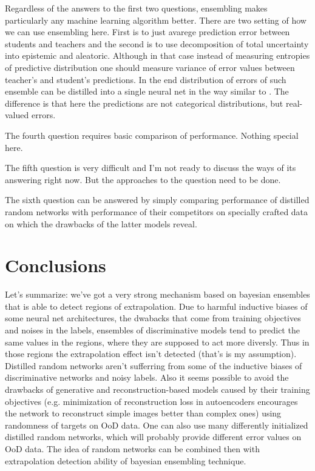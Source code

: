 \documentclass{article}
\begin{document}
    Regardless of the answers to the first two questions, ensembling makes particularly any machine learning algorithm better. There are two setting of how we can use ensembling here. First is to just avarege prediction error between students and teachers and the second is to use decomposition of total uncertainty into epistemic and aleatoric. Although in that case instead of measuring entropies of predictive distribution one should measure variance of error values between teacher's and student's predictions. In the end distribution of errors of such ensemble can be distilled into a single neural net in the way similar to \cite{end2}. The difference is that here the predictions are not categorical distributions, but real-valued errors.

    The fourth question requires basic comparison of performance. Nothing special here.

    The fifth question is very difficult and I'm not ready to discuss the ways of its answering right now. But the approaches to the question need to be done.

    The sixth question can be answered by simply comparing performance of distilled random networks with performance of their competitors on specially crafted data on which the drawbacks of the latter models reveal.

\section{Conclusions}
    Let's summarize: we've got a very strong mechanism based on bayesian ensembles that is able to detect regions of extrapolation. Due to harmful inductive biases of some neural net architectures, the dwabacks that come from training objectives and noises in the labels, ensembles of discriminative models tend to predict the same values in the regions, where they are supposed to act more diversly. Thus in those regions the extrapolation effect isn't detected (that's is my assumption). Distilled random networks \cite{random_network} aren't sufferring from some of the inductive biases of discriminative networks and noisy labels. Also it seems possible to avoid the drawbacks of generative and reconstruction-based models caused by their training objectives (e.g. minimization of reconstruction loss in autoencoders encourages the network to reconstruct simple images better than complex ones) using randomness of targets on OoD data. One can also use many differently initialized distilled random networks, which will probably provide different error values on OoD data. The idea of random networks can be combined then with extrapolation detection ability of bayesian ensembling technique.



\end{document}
